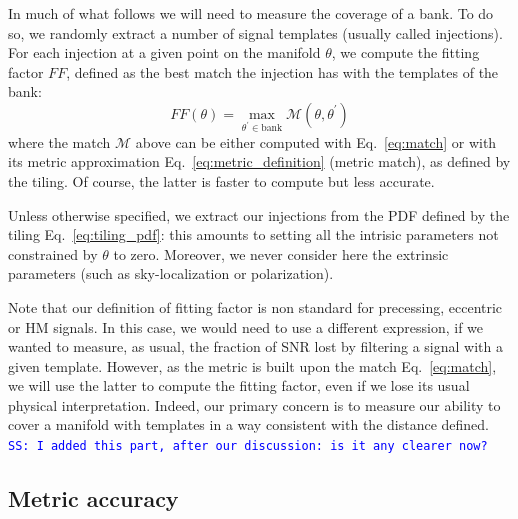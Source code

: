 \documentclass[twocolumn,showpacs,preprintnumbers,nofootinbib,prd,
superscriptaddress,10pt]{revtex4-2}
\newcommand{\stefano}[1]{{\textcolor{blue}{\texttt{SS: #1}} }}
\begin{document}
In much of what follows we will need to measure the coverage of a bank. To do so, we randomly extract a number of signal templates (usually called injections).
For each injection at a given point on the manifold $\theta$, we compute the fitting factor $FF$, defined as the best match the injection has with the templates of the bank:
\begin{equation}\label{eq:FF}
	FF(\theta) = \max_{\theta^\prime \in \text{bank}} \mathcal{M}(\theta, \theta^\prime)
\end{equation}
where the match $\mathcal{M}$ above can be either computed with Eq.~\eqref{eq:match} or with its metric approximation Eq.~\eqref{eq:metric_definition} (metric match), as defined by the tiling.
Of course, the latter is faster to compute but less accurate.

Unless otherwise specified, we extract our injections from the PDF defined by the tiling Eq.~\eqref{eq:tiling_pdf}: this amounts to setting all the intrisic parameters not constrained by $\theta$ to zero.
Moreover, we never consider here the extrinsic parameters (such as sky-localization or polarization).

Note that our definition of fitting factor is non standard for precessing, eccentric or HM signals. In this case, we would need to use a different expression, if we wanted to measure, as usual, the fraction of SNR lost by filtering a signal with a given template. However, as the metric is built upon the match Eq.~\eqref{eq:match}, we will use the latter to compute the fitting factor, even if we lose its usual physical interpretation. Indeed, our primary concern is to measure our ability to cover a manifold with templates in a way consistent with the distance defined.
\stefano{I added this part, after our discussion: is it any clearer now?}

\subsection{Metric accuracy} \label{sec:metric_accuracy}
\end{document}
